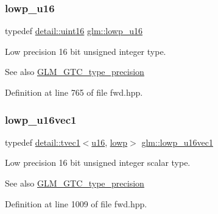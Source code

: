 \subsubsection{\texorpdfstring{lowp\+\_\+u16}{lowp\_u16}}
{\footnotesize\ttfamily typedef \hyperlink{namespaceglm_1_1detail_a47b2a7d006d187338e8031a352d1ce56}{detail\+::uint16} \hyperlink{group__gtc__type__precision_ga22c5364f27caa0a6eb0627cbc21e46be}{glm\+::lowp\+\_\+u16}}

Low precision 16 bit unsigned integer type. \begin{DoxySeeAlso}{See also}
\hyperlink{group__gtc__type__precision}{G\+L\+M\+\_\+\+G\+T\+C\+\_\+type\+\_\+precision} 
\end{DoxySeeAlso}


Definition at line 765 of file fwd.\+hpp.

\mbox{\label{group__gtc__type__precision_ga25464b09e8e3c63f6896605e0c997eb1}} 
\subsubsection{\texorpdfstring{lowp\+\_\+u16vec1}{lowp\_u16vec1}}
{\footnotesize\ttfamily typedef \hyperlink{structglm_1_1detail_1_1tvec1}{detail\+::tvec1}$<$\hyperlink{group__gtc__type__precision_gae7a1571503f83d2264ddfa705a6b082a}{u16}, \hyperlink{namespaceglm_a0f04f086094c747d227af4425893f545ae161af3fc695e696ce3bf69f7332bc2d}{lowp}$>$ \hyperlink{group__gtc__type__precision_ga25464b09e8e3c63f6896605e0c997eb1}{glm\+::lowp\+\_\+u16vec1}}

Low precision 16 bit unsigned integer scalar type. \begin{DoxySeeAlso}{See also}
\hyperlink{group__gtc__type__precision}{G\+L\+M\+\_\+\+G\+T\+C\+\_\+type\+\_\+precision} 
\end{DoxySeeAlso}


Definition at line 1009 of file fwd.\+hpp.

\mbox{\label{group__gtc__type__precision_gaff5ca5a8bc621bb8f4b28f046c0de508}} 
